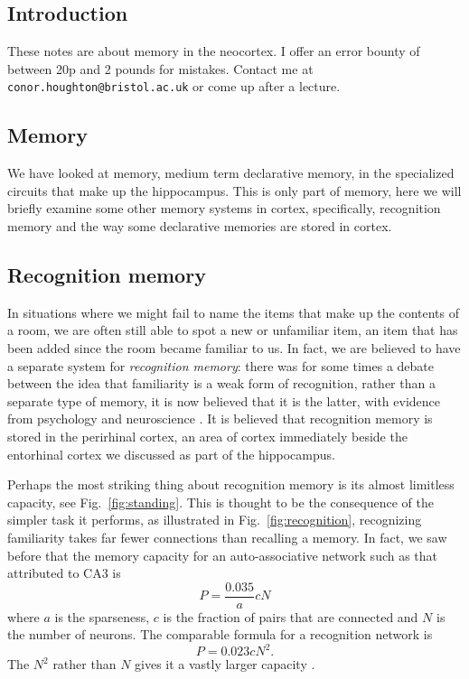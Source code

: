 \documentclass[11pt,a4paper]{scrartcl}
\begin{document}
\subsection*{Introduction}
These notes are about memory in the neocortex. I offer an error bounty of
between 20p and 2 pounds for mistakes. Contact me at
\texttt{conor.houghton@bristol.ac.uk} or come up after a lecture.

\subsection*{Memory}
We have looked at memory, medium term declarative memory, in the
specialized circuits that make up the hippocampus. This is only part
of memory, here we will briefly examine some other memory systems in
cortex, specifically, recognition memory and the way some declarative
memories are stored in cortex.

\subsection*{Recognition memory}

In situations where we might fail to name the items that make up the
contents of a room, we are often still able to spot a new or
unfamiliar item, an item that has been added since the room became
familiar to us. In fact, we are believed to have a separate system for
\textsl{recognition memory}: there was for some times a debate between
the idea that familiarity is a weak form of recognition, rather than a
separate type of memory, it is now believed that it is the latter,
with evidence from psychology \cite{Yonelinas2002a} and neuroscience
\cite{BrownAggleton2001a}. It is believed that recognition memory is
stored in the perirhinal cortex, an area of cortex immediately beside
the entorhinal cortex we discussed as part of the hippocampus.


Perhaps the most striking thing about recognition memory is its almost
limitless capacity, see Fig.~\ref{fig:standing}. This is thought to be
the consequence of the simpler task it performs, as illustrated in
Fig.~\ref{fig:recognition}, recognizing familiarity takes far fewer
connections than recalling a memory. In fact, we saw before that the
memory capacity for an auto-associative network such as that
attributed to CA3 is
\begin{equation}
P=\frac{0.035}{a}cN
\end{equation}
where $a$ is the sparseness, $c$ is the fraction of pairs that are
connected and $N$ is the number of neurons. The comparable formula for
a recognition network is
\begin{equation}
P=0.023cN^2.
\end{equation}
The $N^2$ rather than $N$ gives it a vastly larger capacity \cite{BogaczEtAl2001a}.
\end{document}
